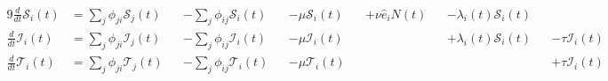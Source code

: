 \begin{alignat}{9}
\frac{d}{dt}\mathcal{S}_i(t) &=
        \sum_j \phi_{ji} \mathcal{S}_j(t)
&&    - \sum_j \phi_{ij} \mathcal{S}_i(t)
&&    - \mu \mathcal{S}_i(t)
&&    + \nu \hat{e}_i N(t)
&&    - \lambda_i(t) \mathcal{S}_i(t)
\\
\frac{d}{dt}\mathcal{I}_i(t) &=
        \sum_j \phi_{ji} \mathcal{I}_j(t)
&&    - \sum_j \phi_{ij} \mathcal{I}_i(t)
&&    - \mu \mathcal{I}_i(t)
&&&&  + \lambda_i(t) \mathcal{S}_i(t)
&&    - \tau \mathcal{I}_i(t)
\\
\frac{d}{dt}\mathcal{T}_i(t) &=
        \sum_j \phi_{ji} \mathcal{T}_j(t)
&&    - \sum_j \phi_{ij} \mathcal{T}_i(t)
&&    - \mu \mathcal{T}_i(t)
&&&&&&+ \tau \mathcal{I}_i(t)
\end{alignat}
\\